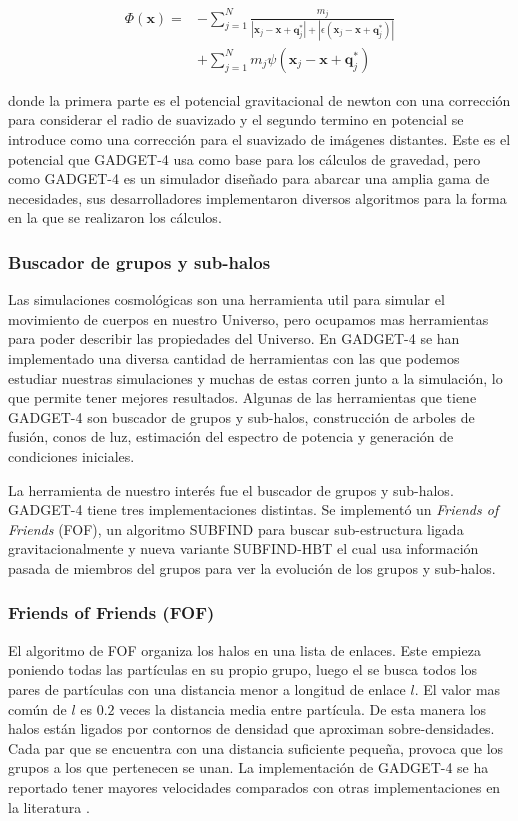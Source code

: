 \begin{align}
    \Phi (\textbf{x}) = &- \sum_{j=1}^{N} \frac{m_j}{|\textbf{x}_j-\textbf{x}+\textbf{q}^*_j| + |\epsilon(\textbf{x}_j-\textbf{x}+\textbf{q}^*_j)|} \nonumber \\
    &+ \sum_{j=1}^{N} m_j \psi (\textbf{x}_j-\textbf{x}+\textbf{q}^*_j) \label{eq:Pot}
\end{align}

\noindent donde la primera parte es el potencial gravitacional de newton con una corrección para considerar el radio de suavizado y el segundo termino en potencial se introduce como una corrección para el suavizado de imágenes distantes. Este es el potencial que GADGET-4 usa como base para los cálculos de gravedad, pero como GADGET-4 es un simulador diseñado para abarcar una amplia gama de necesidades, sus desarrolladores implementaron diversos algoritmos para la forma en la que se realizaron los cálculos.


\subsubsection{Buscador de grupos y sub-halos}

Las simulaciones cosmológicas son una herramienta util para simular el movimiento de cuerpos en nuestro Universo, pero ocupamos mas herramientas para poder describir las propiedades del Universo. En GADGET-4 se han implementado una diversa cantidad de herramientas con las que podemos estudiar nuestras simulaciones y muchas de estas corren junto a la simulación, lo que permite tener mejores resultados. Algunas de las herramientas que tiene GADGET-4 son buscador de grupos y sub-halos, construcción de arboles de fusión, conos de luz, estimación del espectro de potencia y generación de condiciones iniciales. 

La herramienta de nuestro interés fue el buscador de grupos y sub-halos. GADGET-4 tiene tres implementaciones distintas. Se implementó un \textit{Friends of Friends} (FOF), un algoritmo SUBFIND para buscar sub-estructura ligada gravitacionalmente y nueva variante SUBFIND-HBT el cual usa información pasada de miembros del grupos para ver la evolución de los grupos y sub-halos.

\subsubsection{ Friends of Friends (\textbf{FOF}) }
El algoritmo de FOF organiza los halos en una lista de enlaces. Este empieza poniendo todas las partículas en su propio grupo, luego el se busca todos los pares de partículas con una distancia menor a longitud de enlace $l$. El valor mas común de $l$ es $0.2$ veces la distancia media entre partícula. De esta manera los halos están ligados por contornos de densidad que aproximan sobre-densidades. Cada par que se encuentra con una distancia suficiente pequeña, provoca que los grupos a los que pertenecen se unan. La implementación de GADGET-4 se ha reportado tener mayores velocidades comparados con otras implementaciones en la literatura \cite{2021MNRAS.506.2871S}.

